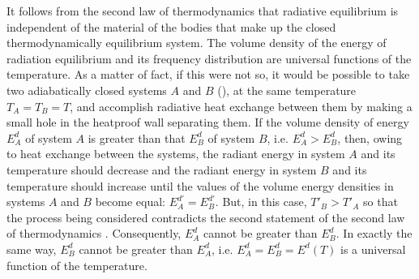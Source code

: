 It follows from the second law of thermodynamics  that radiative equilibrium is independent of the material of the bodies that make up the closed thermodynamically equilibrium system. The volume density of the energy of radiation equilibrium and its frequency distribution are universal functions of the temperature. As a matter of fact, if this were not so, it would be possible to take two adiabatically closed systems $A$ and $B$ (), at the same temperature $T_{A} = T_{B} = T$,
and accomplish radiative heat exchange between them by making
a small hole in the heatproof wall separating them. If the
volume density of energy $E_{A}^{d}$ of system $A$ is greater than that
$E_{B}^{d}$ of system $B$, i.e. $E_{A}^{d}> E_{B}^{d}$, then, owing to heat exchange between the systems, the radiant energy in system $A$ and its temperature should decrease and the radiant energy in system $B$ and its temperature should increase until the values of the volume energy densities in systems $A$ and $B$ become equal: $E_{A}^{d'} = E_{B}^{d'}$. But, in this case, $T'_{B} > T'_{A}$ so that the process being
considered contradicts the second statement of the second law of thermodynamics . Consequently, $E_{A}^{d}$ cannot be greater than $E_{B}^{d}$. In exactly the same way, $E_{B}^{d}$ cannot be greater than $E_{A}^{d}$, i.e. $E_{A}^{d} = E_{B}^{d} = E^{d} (T)$ is a universal function of
the temperature.

